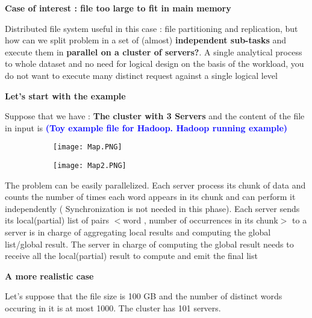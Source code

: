\documentclass{article}
\begin{document}
\vspace{3mm}

\textbf{Case of interest : file too large to fit in main memory}

\vspace{1mm}

Distributed file system useful in this case : file partitioning and replication, but how can we split problem in a set of (almost) \textbf{independent sub-tasks} and execute them in \textbf{parallel on a cluster of servers?}.
A single analytical process to whole dataset and no need for logical design on the basis of the workload, you do not want to execute many distinct request against a single logical level

\textbf{Let's start with the example}
\vspace{3mm}

Suppose that we have : \textbf{The cluster with 3 Servers} and the content of the file in input is \textcolor{blue}{\textbf{(Toy example file for Hadoop. Hadoop running example)} }

\begin{figure}[ht!]
  \centering
  \begin{subfigure}[b]{0.4\linewidth}
    \texttt{[image: Map.PNG]}
  \end{subfigure}
     \begin{subfigure}[b]{0.5\textwidth}
         \centering
         \texttt{[image: Map2.PNG]}
     \end{subfigure}
\end{figure}

\vspace{5mm}
The problem can be easily parallelized. Each server process its chunk of data and counts the number of times each word appears in its chunk and can perform it independently ( Synchronization is not needed in this phase).
Each server sends its local(partial) list of pairs $<$word , number of occurrences in its chunk$>$ to a server is in charge of aggregating local results and computing the global list/global result.
The server in charge of computing the global result needs to receive all the local(partial) result to compute and emit the final list

\vspace{3mm}
\textbf{A more realistic case}

Let's suppose that the file size is 100 GB and the number of distinct words occuring in it is at most 1000. The cluster has 101 servers.
\end{document}
